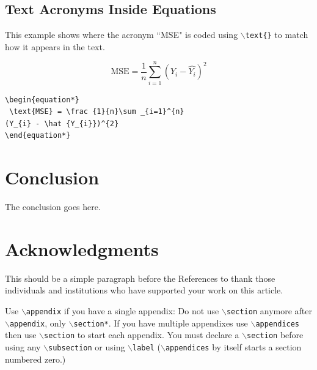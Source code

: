 \subsection{ Text Acronyms Inside Equations}
This example shows where the acronym ``MSE" is coded using $\backslash${\tt{text\{\}}} to match how it appears in the text.

\begin{equation*}
 \text{MSE} = \frac {1}{n}\sum _{i=1}^{n}(Y_{i} - \hat {Y_{i}})^{2}
\end{equation*}

\begin{verbatim}
\begin{equation*}
 \text{MSE} = \frac {1}{n}\sum _{i=1}^{n}
(Y_{i} - \hat {Y_{i}})^{2}
\end{equation*}
\end{verbatim}

\section{Conclusion}
The conclusion goes here.


\section*{Acknowledgments}
This should be a simple paragraph before the References to thank those individuals and institutions who have supported your work on this article.



{
Use $\backslash${\tt{appendix}} if you have a single appendix:
Do not use $\backslash${\tt{section}} anymore after $\backslash${\tt{appendix}}, only $\backslash${\tt{section*}}.
If you have multiple appendixes use $\backslash${\tt{appendices}} then use $\backslash${\tt{section}} to start each appendix.
You must declare a $\backslash${\tt{section}} before using any $\backslash${\tt{subsection}} or using $\backslash${\tt{label}} ($\backslash${\tt{appendices}} by itself
 starts a section numbered zero.)}






